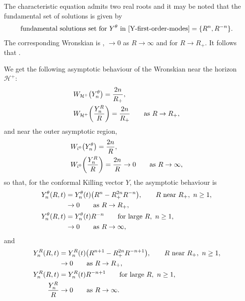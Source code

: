 The characteristic equation admits two real roots and it may be noted that the fundamental set of solutions is given by
\begin{align*}
 \text{fundamental solutions set for $Y^\theta$ in \eqref{Y-first-order-modes}} = \{ R^n, R^{-n} \}.
\end{align*}
The corresponding Wronskian is , $\to 0$ as $R \to \infty$ and  for $R \to R_+$. It follows that .

We get the following asymptotic behaviour of the Wronskian near the horizon $\mathcal{H}^{+}$:
\begin{align*}
&W_{\mathcal{H}^+} \bigl(Y_n^\theta\bigr)= \frac{2n}{R_+}, \notag\\
&W_{\mathcal{H}^+} \biggl(\frac{Y_n^R}{R}\biggr)= \frac{2n}{R_+} \qquad \text{as} \ R \to R_+,
\end{align*}
and near the outer asymptotic region,
\begin{align*}
&W_{\bar{\iota}^0} \bigl(Y_n^\theta\bigr)= \frac{2n}{R}, \notag\\
&W_{\bar{\iota}^0} \biggl(\frac{Y_n^R}{R}\biggr)= \frac{2n}{R} \to 0 \qquad \text{as} \ R \to \infty,
\end{align*}
so that, for the conformal Killing vector $Y$, the asymptotic behaviour is
\begin{subequations} \label{Y-theta-asym}
\begin{align}
	Y_n^ \theta (R, t)&{}= Y_n^\theta (t) \bigl(R^n - R^{2n}_+ R^{-n}\bigr), \qquad R \ \text{near} \ R_+, \ n \geq 1, \notag \\
	&{} \to 0 \qquad \text{as} \ R \to R_+, \\
	Y_n^\theta (R, t)&= Y_n^\theta (t) R^{-n} \qquad \text{for large} \ R, \ n \geq 1, \notag\\
	&{} \to 0 \qquad \text{as} \ R \to \infty,
\end{align}
\end{subequations}
and
\begin{subequations} \label{Y-R-asym}
	\begin{align}
	Y_n^ R (R, t)&{}= Y_n^R (t) \bigl(R^{n+1} - R^{2n}_+ R^{-n+1}\bigr), \qquad R \ \text{near} \ R_+, \ n \geq 1, \notag \\
	&{} \to 0 \qquad \text{as} \ R \to R_+ ,\\
	Y_n^R (R, t)&= Y_n^R (t) R^{-n+1} \qquad \text{for large} \ R, \ n \geq 1, \notag\\
\frac{Y_n^R}{R}	 &{}\to 0 \qquad \text{as} \ R \to \infty.
	\end{align}
\end{subequations}

